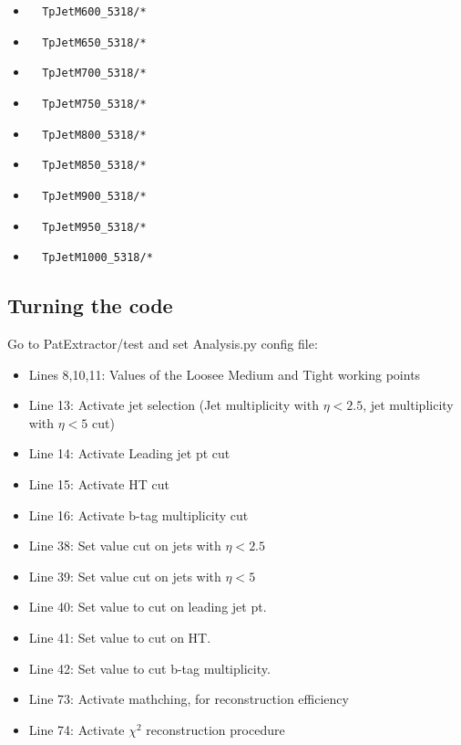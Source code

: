 \documentclass[11pt,a4paper]{article}
\begin{document}
\begin{itemize}
\begin{itemize}
  \item \begin{verbatim}  TpJetM600_5318/* \end{verbatim}
  \item \begin{verbatim}  TpJetM650_5318/* \end{verbatim}
  \item \begin{verbatim}  TpJetM700_5318/* \end{verbatim}
  \item \begin{verbatim}  TpJetM750_5318/* \end{verbatim}
  \item \begin{verbatim}  TpJetM800_5318/* \end{verbatim}
  \item \begin{verbatim}  TpJetM850_5318/* \end{verbatim}
  \item \begin{verbatim}  TpJetM900_5318/* \end{verbatim}
  \item \begin{verbatim}  TpJetM950_5318/* \end{verbatim}
  \item \begin{verbatim}  TpJetM1000_5318/* \end{verbatim}
  \end{itemize}
\end{itemize}

\subsection{Turning the code}

Go to PatExtractor/test and set Analysis.py config file:
\begin{itemize}
\item Lines 8,10,11: Values of the Loosee Medium and Tight working points
\item Line 13: Activate jet selection (Jet multiplicity with $\eta<2.5$, jet multiplicity with $\eta<5$ cut)
\item Line 14: Activate Leading jet pt cut
\item Line 15: Activate HT cut
\item Line 16: Activate b-tag multiplicity cut
\item Line 38: Set value cut on jets with $\eta<2.5$
\item Line 39: Set value cut on jets with $\eta<5$
\item Line 40: Set value to cut on leading jet pt.
\item Line 41: Set value to cut on HT.
\item Line 42: Set value to cut b-tag multiplicity.
\item Line 73: Activate mathching, for reconstruction efficiency
\item Line 74: Activate $\chi^{2}$ reconstruction procedure
\end{itemize}
\end{document}
